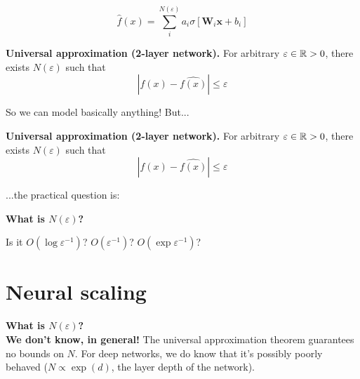 \begin{frame}
    \[
        \hat{f}(x) =  \sum_i^{N(\varepsilon)} a_i \sigma \left[\mathbf{W}_i \mathbf{x} + b_i \right]
    \]
    \begin{theorem}
        \textbf{Universal approximation (2-layer network).} For arbitrary $\varepsilon \in \mathbb{R} > 0$, there
        exists $N(\varepsilon)$ such that 
        \[
        |f(x) - \hat{f(x)}| \leq \varepsilon
        \]
    \end{theorem}
    So we can model basically anything! But...
\end{frame}

\begin{frame}
    \begin{theorem}
        \textbf{Universal approximation (2-layer network).} For arbitrary $\varepsilon \in \mathbb{R} > 0$, there
        exists $N(\varepsilon)$ such that 
        \[
        |f(x) - \hat{f(x)}| \leq \varepsilon
        \]
    \end{theorem}
    ...the practical question is:
    \begin{center}
        \textbf{What is $N(\varepsilon)$?}
    \end{center}
    Is it $O(\log \varepsilon^{-1})$? $O(\varepsilon^{-1})$? $O(\exp \varepsilon^{-1})$?
\end{frame}
\section{Neural scaling}
\begin{frame}
    \textbf{What is $N(\varepsilon)$?}
    \\
    \textbf{We don't know, in general!} The universal approximation theorem guarantees no bounds on $N$. 
    For deep networks,
    we do know that it's possibly poorly behaved ($N \propto \exp(d)$, the layer depth of the network).
\end{frame}

